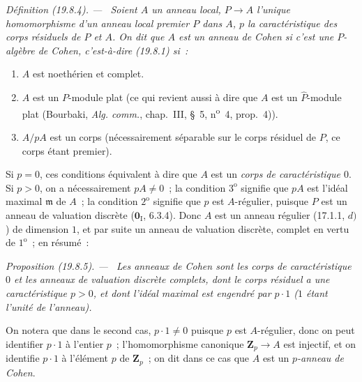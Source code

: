 \documentclass[10pt,oneside]{book}
\makeatletter
\newcommand{\setmanualcurrentlabel}[1]{\def\@currentlabel{#1}}
\newcommand{\oldpage}[2][]{%
  \setcounter{footnote}{0}%
  \marginpar{\scriptsize\textbf{#1}~|~#2}\ignorespaces}
\newenvironment{definition}[1][]{%
  \setmanualcurrentlabel{#1}\par\medskip\noindent\itshape Définition (#1). ---\ }{\par}
\newenvironment{proposition}[1][]{%
  \setmanualcurrentlabel{#1}\par\medskip\noindent\itshape Proposition (#1). ---\ }{\par}
\makeatother
\begin{document}

%
\oldpage[0\textsubscript{IV-1}]{111}

\begin{definition}[19.8.4]
\label{0.19.8.4-fr}
Soient $A$ un anneau local, $P\to A$ l'unique homomorphisme d'un anneau local
premier $P$ dans $A$, $p$ la caractéristique des corps résiduels de $P$ et
$A$. On dit que $A$ est un \emph{anneau de Cohen} si c'est une $P$-algèbre de
Cohen, c'est-à-dire (19.8.1) si~:
\begin{enumerate}
  \item[$1^{\mathrm o}$] $A$ est noethérien et complet.
  \item[$2^{\mathrm o}$] $A$ est un $P$-module plat (ce qui revient aussi à
  dire que $A$ est un $\widehat P$-module plat (Bourbaki, \emph{Alg. comm.},
  chap.~III, §~5, n\textsuperscript{o}~4, prop.~4)).
  \item[$3^{\mathrm o}$] $A/pA$ est un corps (nécessairement séparable sur le
  corps résiduel de $P$, ce corps étant premier).
\end{enumerate}
\end{definition}

Si $p=0$, ces conditions équivalent à dire que $A$ est un \emph{corps de
caractéristique $0$}. Si $p>0$, on a nécessairement $pA\neq0$~; la condition
$3^{\mathrm o}$ signifie que $pA$ est l'idéal maximal $\mathfrak m$ de $A$~;
la condition $2^{\mathrm o}$ signifie que $p$ est $A$-régulier, puisque $P$
est un anneau de valuation discrète ($\mathbf 0_{\mathrm I}$, 6.3.4). Donc $A$
est un anneau régulier (17.1.1, $d)$) de dimension $1$, et par suite un anneau
de valuation discrète, complet en vertu de $1^{\mathrm o}$~; en résumé~:

\begin{proposition}[19.8.5]
\label{0.19.8.5-fr}
Les anneaux de Cohen sont les corps de caractéristique $0$ et les anneaux de
valuation discrète complets, dont le corps résiduel a une caractéristique
$p>0$, et dont l'idéal maximal est engendré par $p\cdot1$ ($1$ étant l'unité de
l'anneau).
\end{proposition}

On notera que dans le second cas, $p\cdot1\neq0$ puisque $p$ est $A$-régulier,
donc on peut identifier $p\cdot1$ à l'entier $p$~; l'homomorphisme canonique
$\mathbf Z_p\to A$ est injectif, et on identifie $p\cdot1$ à l'élément $p$ de
$\mathbf Z_p$~; on dit dans ce cas que $A$ est un \emph{$p$-anneau de Cohen}.
\end{document}
